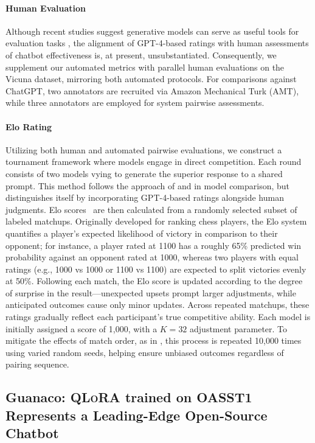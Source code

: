 \paragraph{Human Evaluation} Although recent studies suggest generative models can serve as useful tools for evaluation tasks \citep{fu2023gptscore}, the alignment of GPT-4-based ratings with human assessments of chatbot effectiveness is, at present, unsubstantiated. Consequently, we supplement our automated metrics with parallel human evaluations on the Vicuna dataset, mirroring both automated protocols. For comparisons against ChatGPT, two annotators are recruited via Amazon Mechanical Turk (AMT), while three annotators are employed for system pairwise assessments.

\paragraph{Elo Rating} Utilizing both human and automated pairwise evaluations, we construct a tournament framework where models engage in direct competition. Each round consists of two models vying to generate the superior response to a shared prompt. This method follows the approach of \citet{bai2022training} and \citet{vicuna2023} in model comparison, but distinguishes itself by incorporating GPT-4-based ratings alongside human judgments. Elo scores~\citep{elo1967proposed,elo1978rating} are then calculated from a randomly selected subset of labeled matchups. Originally developed for ranking chess players, the Elo system quantifies a player’s expected likelihood of victory in comparison to their opponent; for instance, a player rated at 1100 has a roughly 65\% predicted win probability against an opponent rated at 1000, whereas two players with equal ratings (e.g., 1000 vs 1000 or 1100 vs 1100) are expected to split victories evenly at 50\%. Following each match, the Elo score is updated according to the degree of surprise in the result—unexpected upsets prompt larger adjustments, while anticipated outcomes cause only minor updates. Across repeated matchups, these ratings gradually reflect each participant’s true competitive ability. Each model is initially assigned a score of 1,000, with a $K=32$ adjustment parameter. To mitigate the effects of match order, as in \citet{vicuna2023}, this process is repeated 10,000 times using varied random seeds, helping ensure unbiased outcomes regardless of pairing sequence.

\subsection{\textbf{Guanaco}: \textsc{QLoRA} trained on OASST1 Represents a Leading-Edge Open-Source Chatbot}

